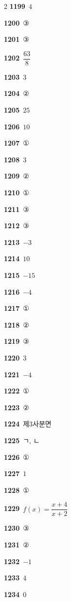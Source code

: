 \documentclass[10pt,a4paper]{article}
\begin{document}
\begin{multicols}{2}
\noindent\textbf{1199}\ $4$\par
\noindent\textbf{1200}\ ③\par
\noindent\textbf{1201}\ ③\par
\noindent\textbf{1202}\ $\dfrac{63}{8}$\par
\noindent\textbf{1203}\ $3$\par
\noindent\textbf{1204}\ ②\par
\noindent\textbf{1205}\ $25$\par
\noindent\textbf{1206}\ $10$\par
\noindent\textbf{1207}\ ①\par
\noindent\textbf{1208}\ $3$\par
\noindent\textbf{1209}\ ②\par
\noindent\textbf{1210}\ ①\par
\noindent\textbf{1211}\ ③\par
\noindent\textbf{1212}\ ③\par
\noindent\textbf{1213}\ $-3$\par
\noindent\textbf{1214}\ $10$\par
\noindent\textbf{1215}\ $-15$\par
\noindent\textbf{1216}\ $-4$\par
\noindent\textbf{1217}\ ①\par
\noindent\textbf{1218}\ ②\par
\noindent\textbf{1219}\ ③\par
\noindent\textbf{1220}\ $3$\par
\noindent\textbf{1221}\ $-4$\par
\noindent\textbf{1222}\ ①\par
\noindent\textbf{1223}\ ②\par
\noindent\textbf{1224}\ 제$3$사분면\par
\noindent\textbf{1225}\ ㄱ, ㄴ\par
\noindent\textbf{1226}\ ①\par
\noindent\textbf{1227}\ $1$\par
\noindent\textbf{1228}\ ①\par
\noindent\textbf{1229}\ $f(x)=\dfrac{x+4}{x+2}$\par
\noindent\textbf{1230}\ ③\par
\noindent\textbf{1231}\ ②\par
\noindent\textbf{1232}\ $-1$\par
\noindent\textbf{1233}\ $4$\par
\noindent\textbf{1234}\ $0$\par

\end{multicols}
\end{document}

